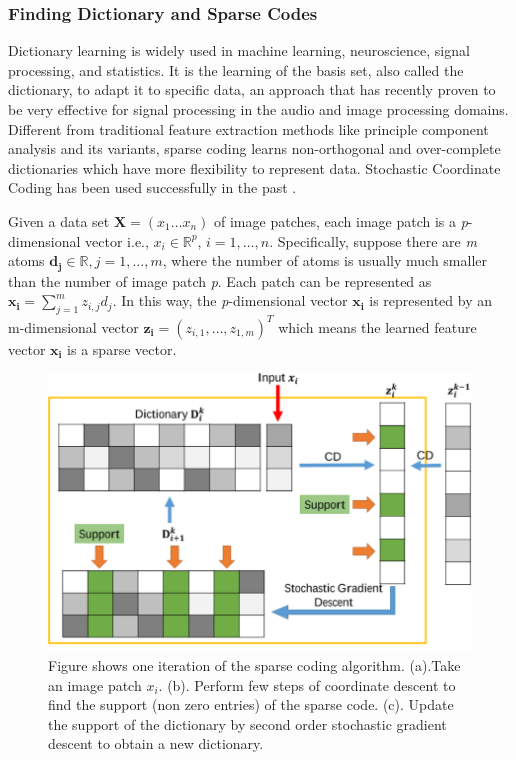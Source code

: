 \documentclass[authoryear,preprint,revi	ew,12pt]{elsarticle}
\begin{document}
\subsubsection{Finding Dictionary and Sparse Codes}
\label{sec:dictionary_learning}
Dictionary learning is widely used in machine learning, neuroscience, signal processing, and statistics. It is the learning of the basis set, also called the dictionary, to adapt it to specific data, an approach that has recently proven to be very effective for signal processing in the audio and image processing domains. Different from traditional feature extraction methods like principle component analysis and its variants, sparse coding learns non-orthogonal and over-complete dictionaries which have more flexibility to represent data. Stochastic Coordinate Coding has been used successfully in the past \citep{lin2014stochastic,mairal2009online}. 

Given a data set $\mathbf{X} = (x_1 \dots x_n)$ of image patches, each image patch is a {\em p}-dimensional vector i.e., $ x_i \in \mathbb{R}^{p} $, $ i = 1, \dots, n $. Specifically, suppose there are \emph{m} atoms $ \mathbf{d_j} \in \mathbb{R}, j = 1,\dots,m $, where the number of atoms is usually much smaller than the number of image patch {\em p}. Each patch can be represented as $ \mathbf{x_i} =  \sum^m_{j=1} z_{i,j}d_j $. In this way, the {\em p}-dimensional vector $ \mathbf{x_i} $ is represented by an m-dimensional vector $  \mathbf{z_i} = (z_{i,1},\dots,z_{1,m})^T $ which means the learned feature vector $ \mathbf{x_i} $ is a sparse vector. 

\begin{figure}
	\centering
	\includegraphics[width=0.6\linewidth]{figures/iteration}
	\caption[One Iteration of SCC]{Figure shows one iteration of the sparse coding algorithm. (a).Take an image patch $x_i$. (b). Perform few steps of coordinate descent to find the support (non zero entries) of the sparse code. (c). Update the support of the dictionary by second order stochastic gradient descent to obtain a new dictionary.}
	\label{fig:iteration}
\end{figure}
\end{document}
